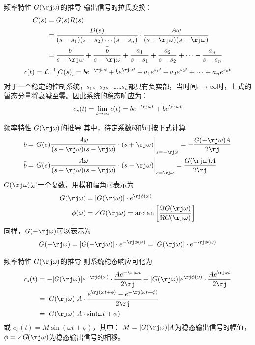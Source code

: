 \documentclass[handout,cjkutf8,table,aspectratio=1610]{beamer} %
\begin{document}
\begin{frame}{频率特性 $G(\rj\omega)$的推导}
	输出信号的拉氏变换：
	\begin{align*}
		C(s) 	&= G(s)R(s)\\
			&= \frac{D(s)}{(s-s_1)(s-s_2)\cdots(s-s_n)}\cdot\frac{A\omega}{(s+\rj\omega)(s-\rj\omega)}\\
			&= \frac{b}{s+\rj\omega} + \frac{\bar{b}}{s-\rj\omega} + \frac{a_1}{s-s_1} + \frac{a_2}{s-s_2} + \cdots + \frac{a_n}{s-s_n}
	\end{align*}
	$$c(t) = \mathcal{L}^{-1}[C(s)] = be^{-\rj\omega t} + \bar{b}e^{\rj\omega t} + a_1e^{s_1t} + a_2e^{s_2t} + \cdots + a_ne^{s_nt}$$
	对于一个\alert{稳定}的控制系统，$s_1$、$s_2$、……$s_n$都具有负实部，当时间$t\rightarrow\infty$时，上式的暂态分量将衰减至零。因此系统的稳态响应为：
	$$c_s(t) = \lim_{t\rightarrow\infty}c(t) = be^{-\rj\omega t} + \bar{b}e^{\rj\omega t}$$
\end{frame}

\begin{frame}{频率特性 $G(\rj\omega)$的推导}
	其中，待定系数$b$和$\bar{b}$可按下式计算
	\begin{align*}
		b		&= \left.G(s)\frac{A\omega}{(s+\rj\omega)(s-\rj\omega)}\cdot(s+\rj\omega)\right|_{s=-\rj\omega} = -\frac{G(-\rj\omega)A}{2\rj}\\
		\bar{b}	&= \left.G(s)\frac{A\omega}{(s+\rj\omega)(s-\rj\omega)}\cdot(s-\rj\omega)\right|_{s=\rj\omega} = \frac{G(\rj\omega)A}{2\rj}
	\end{align*}
	$G(\rj\omega)$是一个复数，用模和幅角可表示为
	\begin{align*}
		G(\rj\omega)	&= |G(\rj\omega)|\cdot e^{\rj\phi(\omega)}\\
		\phi(\omega)	&= \angle G(\rj\omega) = \arctan\left[\frac{\Im G(\rj\omega)}{\Re G(\rj\omega)}\right]
	\end{align*}
	同样，$G(-\rj\omega)$可以表示为
	$$G(-\rj\omega)=|G(-\rj\omega)|\cdot e^{-\rj\phi(\omega)} = |G(\rj\omega)|\cdot e^{-\rj\phi(\omega)}$$
\end{frame}

\begin{frame}{频率特性 $G(\rj\omega)$的推导}
	则系统稳态响应可化为
	\begin{align*}
		c_s(t) 	&= -|G(\rj\omega)|e^{-\rj\phi(\omega)}\cdot\frac{Ae^{-\rj\omega t}}{2\rj} + |G(\rj\omega)|e^{\rj\phi(\omega)}\cdot\frac{Ae^{\rj\omega t}}{2\rj}\\
				&= |G(\rj\omega)|A\cdot\frac{e^{\rj(\omega t + \phi)}-e^{-\rj(\omega t + \phi)}}{2\rj}\\
				&= |G(\rj\omega)|A\cdot\sin(\omega t + \phi)
	\end{align*}
	或 $c_s(t) = M\sin(\omega t+\phi)$，其中：
	$M = |G(\rj\omega)|A$为稳态输出信号的\alert{幅值}，\\
	$\phi=\angle G(\rj\omega)$为稳态输出信号的\alert{相移}。
\end{frame}
\end{document}
